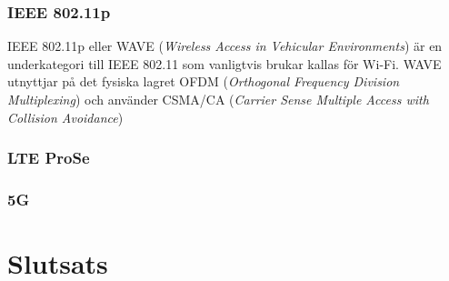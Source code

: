 \documentclass[a4paper]{IEEEtran}
\begin{document}
\subsubsection{IEEE 802.11p}
IEEE 802.11p eller WAVE (\emph{Wireless Access in Vehicular Environments}) är en underkategori till IEEE 802.11 som vanligtvis brukar kallas för Wi-Fi. 
WAVE utnyttjar på det fysiska lagret OFDM (\emph{Orthogonal Frequency Division Multiplexing}) och använder CSMA/CA (\emph{Carrier Sense Multiple Access with Collision Avoidance})

\subsubsection{LTE ProSe}
\subsubsection{5G}


\section{Slutsats}
\end{document}
